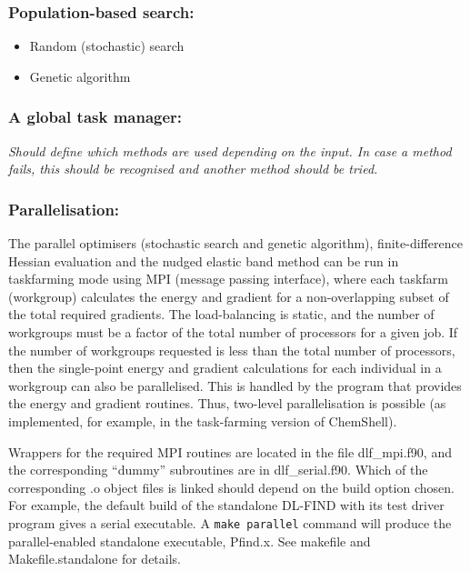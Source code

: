 \documentclass{article}
\begin{document}
\subsubsection{Population-based search:}
\begin{itemize}
\item Random (stochastic) search \cite{brooks57,luusj73}
\item Genetic algorithm \cite{holland75,goldberg89,haupth98}
\end{itemize}

\subsubsection{A global task manager:}

\emph{Should define which methods are used depending on the input. In case a
  method fails, this should be recognised and another method should be tried.}

\subsubsection{Parallelisation:}

The parallel optimisers (stochastic search and genetic algorithm), finite-difference
Hessian evaluation and the nudged elastic band method can be run
in taskfarming mode using MPI (message passing interface), where each taskfarm (workgroup)
calculates the energy and gradient 
for a non-overlapping subset of the total required gradients. The load-balancing 
is static, and the number of workgroups must be a factor of the total number of 
processors for a given job.  If the number of workgroups requested is less than the
total number of processors, then the single-point energy and gradient calculations 
for each individual in a workgroup can also be parallelised.  This is handled by
the program that provides the energy and gradient routines.  Thus, two-level 
parallelisation is possible (as implemented, for example, 
in the task-farming version of ChemShell).  

Wrappers for the required MPI routines are located in the file dlf\_mpi.f90, and the 
corresponding ``dummy'' subroutines are in dlf\_serial.f90.  Which of the corresponding 
.o object files is linked should depend on the build option chosen.  For example, the default build 
of the standalone DL-FIND with its test driver program gives a serial executable.
A \texttt{make parallel} command will produce the parallel-enabled standalone executable, 
Pfind.x.  See makefile and Makefile.standalone for details.
\end{document}
